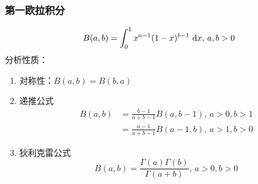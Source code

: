 \subsubsection{第一欧拉积分}
\[B(a,b)=\displaystyle\int_{0}^{1}{x^{a-1}(1-x)^{b-1}}\,\,\mathrm{d} x,\,a,b>0\]
分析性质：
\begin{enumerate}
	\item 对称性：$B(a,b)=B(b,a)$
	\item 递推公式
	\[\begin{aligned}
	B(a,b)&=\frac{b-1}{a+b-1}B(a,b-1),\,a>0,b>1\\
	&=\frac{a-1}{a+b-1}B(a-1,b),\,a>1,b>0
	\end{aligned}\]
	\item 狄利克雷公式
	\[B(a,b)=\frac{\Gamma(a)\Gamma(b)}{\Gamma(a+b)},\,a>0,b>0\]
\end{enumerate}